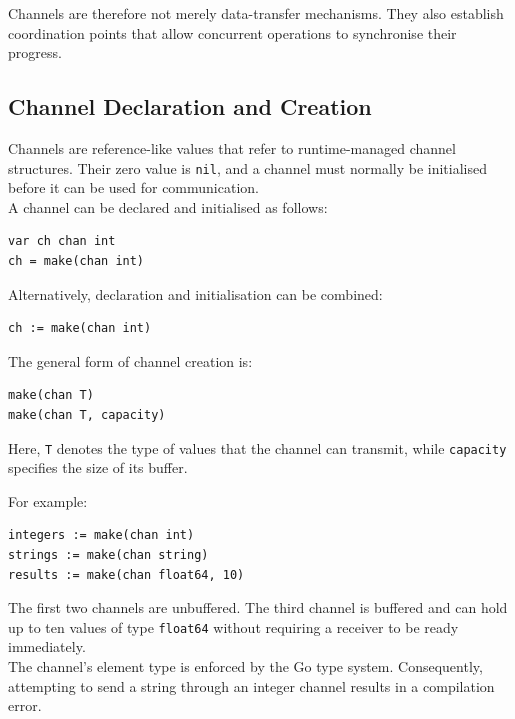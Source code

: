 Channels are therefore not merely data-transfer mechanisms. They also establish coordination points that allow concurrent operations to synchronise their progress.\\

\subsection{Channel Declaration and Creation}

Channels are reference-like values that refer to runtime-managed channel structures. Their zero value is \texttt{nil}, and a channel must normally be initialised before it can be used for communication.\\

A channel can be declared and initialised as follows:

\begin{lstlisting}
var ch chan int
ch = make(chan int)
\end{lstlisting}

Alternatively, declaration and initialisation can be combined:

\begin{lstlisting}
ch := make(chan int)
\end{lstlisting}

The general form of channel creation is:

\begin{lstlisting}
make(chan T)
make(chan T, capacity)
\end{lstlisting}

Here, \texttt{T} denotes the type of values that the channel can transmit, while \texttt{capacity} specifies the size of its buffer.

For example:

\begin{lstlisting}
integers := make(chan int)
strings := make(chan string)
results := make(chan float64, 10)
\end{lstlisting}

The first two channels are unbuffered. The third channel is buffered and can hold up to ten values of type \texttt{float64} without requiring a receiver to be ready immediately.\\

The channel's element type is enforced by the Go type system. Consequently, attempting to send a string through an integer channel results in a compilation error.\\

